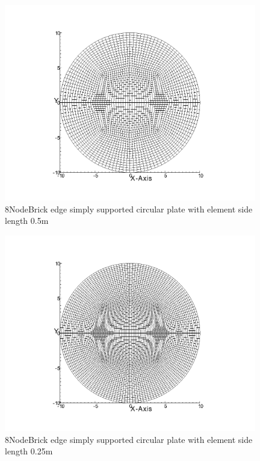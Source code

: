 \documentclass[fleqn,11pt,letter]{article}
\begin{document}
\begin{figure}[H]
  \centering
  \includegraphics[width=11cm]{../Figure_files/8NodeBrick/circular_plate5.png}
  \caption{8NodeBrick edge simply supported circular plate with element side length 0.5m }
  \label{fig 8NodeBrick edges simply supported circular plate with element side length 0.5m }
\end{figure}

\newpage

\begin{figure}[H]
  \centering
  \includegraphics[width=11cm]{../Figure_files/8NodeBrick/circular_plate6.png}
  \caption{8NodeBrick edge simply supported circular plate with element side length 0.25m }
  \label{fig 8NodeBrick edges simply supported circular plate with element side length 0.25m }
\end{figure}
\end{document}
